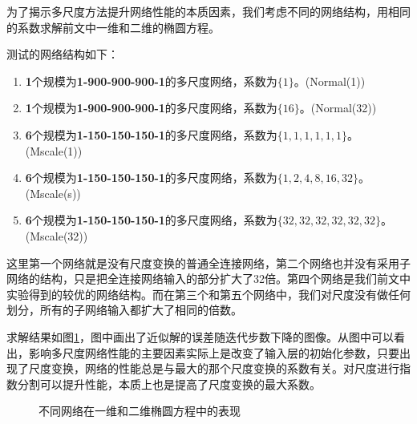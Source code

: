 
为了揭示多尺度方法提升网络性能的本质因素，我们考虑不同的网络结构，用相同的系数求解前文中一维和二维的椭圆方程。

测试的网络结构如下：
\begin{enumerate}
\item \textbf{1}个规模为\textbf{1-900-900-900-1}的多尺度网络，系数为$\{1\}$。(Normal(1))
\item \textbf{1}个规模为\textbf{1-900-900-900-1}的多尺度网络，系数为$\{16\}$。(Normal(32))
\item \textbf{6}个规模为\textbf{1-150-150-150-1}的多尺度网络，系数为$\{1,1,1,1,1,1\}$。(Mscale(1))
\item \textbf{6}个规模为\textbf{1-150-150-150-1}的多尺度网络，系数为$\{1,2,4,8,16,32\}$。(Mscale(s))
\item \textbf{6}个规模为\textbf{1-150-150-150-1}的多尺度网络，系数为$\{32,32,32,32,32,32\}$。(Mscale(32))
\end{enumerate}

这里第一个网络就是没有尺度变换的普通全连接网络，第二个网络也并没有采用子网络的结构，只是把全连接网络输入的部分扩大了32倍。第四个网络是我们前文中实验得到的较优的网络结构。而在第三个和第五个网络中，我们对尺度没有做任何划分，所有的子网络输入都扩大了相同的倍数。

求解结果如图\ref{efuck}，图中画出了近似解的误差随迭代步数下降的图像。从图中可以看出，影响多尺度网络性能的主要因素实际上是改变了输入层的初始化参数，只要出现了尺度变换，网络的性能总是与最大的那个尺度变换的系数有关。对尺度进行指数分割可以提升性能，本质上也是提高了尺度变换的最大系数。

\begin{figure}[htbp]
\centering
{}
\caption{不同网络在一维和二维椭圆方程中的表现}
\label{efuck}
\end{figure}
